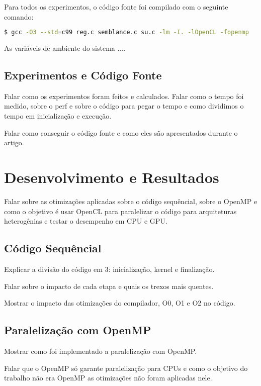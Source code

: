 \documentclass[paper=a4, fontsize=12pt]{scrartcl} %
\numberwithin{equation}{section} %
\numberwithin{figure}{section} %
\numberwithin{table}{section} %
\begin{document}
Para todos os experimentos, o código fonte foi compilado com o seguinte comando:
\begin{lstlisting}[language=bash, caption=Comando para compilar o código fonte dos experimentos.]
$ gcc -O3 --std=c99 reg.c semblance.c su.c -lm -I. -lOpenCL -fopenmp
\end{lstlisting}

As variáveis de ambiente do sistema ....

\subsection{Experimentos  e Código Fonte}

Falar como os experimentos foram feitos e calculados. Falar como o tempo foi medido, sobre o perf e sobre o código para pegar o tempo e como dividimos o tempo em inicialização e execução.

Falar como conseguir o código fonte e como eles são apresentados durante o artigo.

\section{Desenvolvimento e Resultados}

Falar sobre as otimizações aplicadas sobre o código sequêncial, sobre o OpenMP e como o objetivo é usar OpenCL para paralelizar o código para arquiteturas heterogênias e testar o desempenho em CPU e GPU.

\subsection{Código Sequêncial}

Explicar a divisão do código em 3: inicialização, kernel e finalização.

Falar sobre o impacto de cada etapa e quais os trexos mais quentes.

Mostrar o impacto das otimizações do compilador, O0, O1 e O2 no código.

\subsection{Paralelização com OpenMP}

Mostrar como foi implementado a paralelização com OpenMP.

Falar que o OpenMP só garante paralelização para CPUs e como o objetivo do trabalho não era OpenMP as otimizações não foram aplicadas nele.
\end{document}
